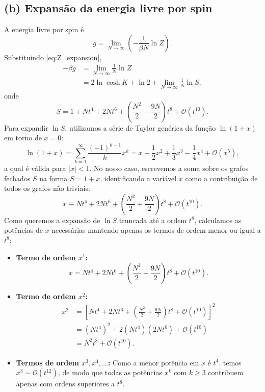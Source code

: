 \documentclass[11pt,a4paper]{article}
\begin{document}
\subsection*{(b) Expansão da energia livre por spin}
A energia livre por spin é
%
\begin{equation}
    g = \lim_{N\to\infty} \left(-\frac{1}{\beta N} \ln Z\right).
\end{equation}
%
Substituindo \eqref{eq:Z_expansion},
%
\begin{align}
    -\beta g
    &= \lim_{N\to\infty} \frac{1}{N} \ln Z \nonumber\\
    &= 2 \ln \cosh K + \ln 2
    + \lim_{N\to\infty} \frac{1}{N} \ln S,
\end{align}
%
onde
%
\begin{equation}
    S = 1 + N t^4 + 2N t^6
    + \left(\frac{N^2}{2} + \frac{9N}{2}\right) t^8
    + \mathcal O(t^{10}).
\end{equation}
%
Para expandir $\ln S$, utilizamos a série de Taylor genérica da função $\ln(1+x)$ em torno de $x = 0$:
\begin{equation}
    \ln(1 + x) = \sum_{k=1}^{\infty} \frac{(-1)^{k-1}}{k} x^k = x - \frac{1}{2} x^2 + \frac{1}{3} x^3 - \frac{1}{4} x^4 + \mathcal{O}(x^5),
    \label{eq:ln_taylor_generic}
\end{equation}
a qual é válida para $|x| < 1$. No nosso caso, escrevemos a soma sobre os grafos fechados $S$ na forma $S = 1 + x$, identificando a variável $x$ como a contribuição de todos os grafos não triviais:
%
\begin{equation}
    x \equiv N t^4 + 2N t^6 + \left(\frac{N^2}{2} + \frac{9N}{2}\right) t^8 + \mathcal{O}(t^{10}).
\end{equation}
%
Como queremos a expansão de $\ln S$ truncada até a ordem $t^8$, calculamos as potências de $x$ necessárias mantendo apenas os termos de ordem menor ou igual a $t^8$:
%
\begin{itemize}
    \item \textbf{Termo de ordem $x^1$:}
    \begin{equation}
        x = N t^4 + 2N t^6 + \left(\frac{N^2}{2} + \frac{9N}{2}\right) t^8 + \mathcal{O}(t^{10}).
    \end{equation}
    \item \textbf{Termo de ordem $x^2$:}
    \begin{align}
        x^2 &= \left[ N t^4 + 2N t^6 + \left(\frac{N^2}{2} + \frac{9N}{2}\right) t^8 + \mathcal{O}(t^{10}) \right]^2 \nonumber\\
            &= \left(N t^4\right)^2 + 2(N t^4)(2N t^6) + \mathcal{O}(t^{10}) \nonumber\\
            &= N^2 t^8 + \mathcal{O}(t^{10}).
    \end{align}
    \item \textbf{Termos de ordem $x^3, x^4, \dots$:}
    Como a menor potência em $x$ é $t^4$, temos $x^3 \sim \mathcal{O}(t^{12})$, de modo que todas as potências $x^k$ com $k \ge 3$ contribuem apenas com ordens superiores a $t^8$. 
\end{itemize}
\end{document}
